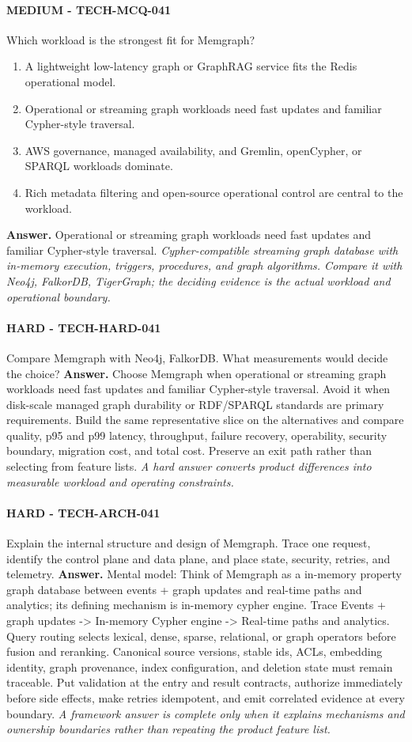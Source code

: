 \paragraph{MEDIUM - TECH-MCQ-041} Which workload is the strongest fit for Memgraph?
\begin{enumerate}[label=\Alph*.]
\item A lightweight low-latency graph or GraphRAG service fits the Redis operational model.
\item Operational or streaming graph workloads need fast updates and familiar Cypher-style traversal.
\item AWS governance, managed availability, and Gremlin, openCypher, or SPARQL workloads dominate.
\item Rich metadata filtering and open-source operational control are central to the workload.
\end{enumerate}
\textbf{Answer.} Operational or streaming graph workloads need fast updates and familiar Cypher-style traversal.
\textit{Cypher-compatible streaming graph database with in-memory execution, triggers, procedures, and graph algorithms. Compare it with Neo4j, FalkorDB, TigerGraph; the deciding evidence is the actual workload and operational boundary.}
\paragraph{HARD - TECH-HARD-041} Compare Memgraph with Neo4j, FalkorDB. What measurements would decide the choice?
\textbf{Answer.} Choose Memgraph when operational or streaming graph workloads need fast updates and familiar Cypher-style traversal. Avoid it when disk-scale managed graph durability or RDF/SPARQL standards are primary requirements. Build the same representative slice on the alternatives and compare quality, p95 and p99 latency, throughput, failure recovery, operability, security boundary, migration cost, and total cost. Preserve an exit path rather than selecting from feature lists.
\textit{A hard answer converts product differences into measurable workload and operating constraints.}
\paragraph{HARD - TECH-ARCH-041} Explain the internal structure and design of Memgraph. Trace one request, identify the control plane and data plane, and place state, security, retries, and telemetry.
\textbf{Answer.} Mental model: Think of Memgraph as a in-memory property graph database between events + graph updates and real-time paths and analytics; its defining mechanism is in-memory cypher engine. Trace Events + graph updates -> In-memory Cypher engine -> Real-time paths and analytics. Query routing selects lexical, dense, sparse, relational, or graph operators before fusion and reranking. Canonical source versions, stable ids, ACLs, embedding identity, graph provenance, index configuration, and deletion state must remain traceable. Put validation at the entry and result contracts, authorize immediately before side effects, make retries idempotent, and emit correlated evidence at every boundary.
\textit{A framework answer is complete only when it explains mechanisms and ownership boundaries rather than repeating the product feature list.}
